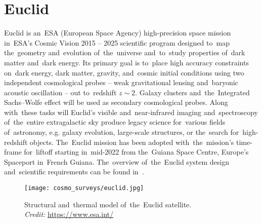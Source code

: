 \section{Euclid}
Euclid is an~ESA (European Space Agency) high-precision space mission in~ESA's Cosmic Vision 2015 -- 2025 scientific program designed to~map the~geometry and~evolution of~the~universe and~to~study properties of~dark matter and~dark energy. Its primary goal is to~place high accuracy constraints on~dark energy, dark matter, gravity, and~cosmic initial conditions using two independent cosmological probes -- weak gravitational lensing and~baryonic acoustic oscillation -- out to~redshift $z\sim2$. Galaxy clusters and~the~Integrated Sachs--Wolfe effect will be used as secondary cosmological probes. Along with~these tasks will Euclid's visible and~near-infrared imaging and~spectroscopy of~the~entire extragalactic sky produce legacy science for~various fields of~astronomy, e.g. galaxy evolution, large-scale structures, or the~search for~high-redshift objects. The~Euclid mission has been adopted with~the~mission's time-frame for~liftoff starting in~mid-2022 from the~Guiana Space Centre, Europe's Spaceport in~French Guiana. The~overview of~the~Euclid system design and~scientific requirements can be found in~\cite{2011arXiv1110.3193L}.
\begin{figure}[htb]
    \centering
    \texttt{[image: cosmo\_surveys/euclid.jpg]}
    \caption{Structural and~thermal model of~the~Euclid satellite.\\\textit{Credit:} \url{https://www.esa.int/}}
    \label{fig:euclid}
\end{figure}
\clearpage
